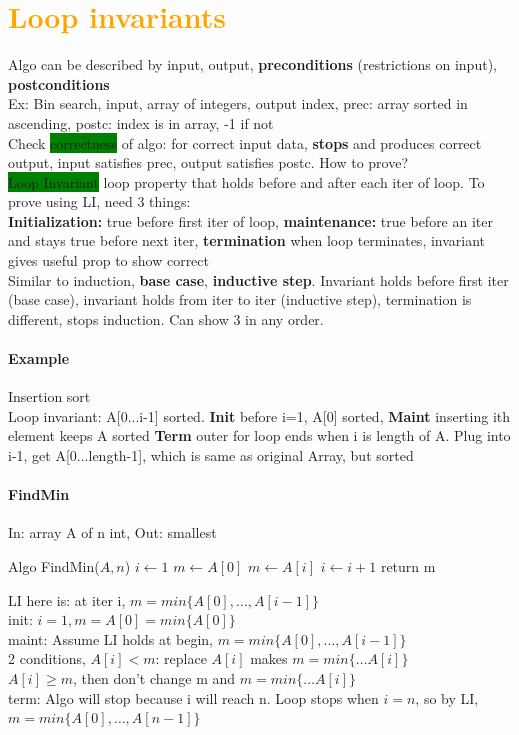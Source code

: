 \section{\textcolor{Orange}{Loop invariants}}
Algo can be described by input, output, \textbf{preconditions} (restrictions on input), \textbf{postconditions}
\\ Ex: Bin search, input, array of integers, output index, prec: array sorted in ascending, postc: index is in array, -1 if not
\\ Check \colorbox{Green}{correctness} of algo: for correct input data, \textbf{stops} and produces correct output, input satisfies prec, output satisfies postc. How to prove? 
\\ \colorbox{Green}{Loop Invariant} loop property that holds before and after each iter of loop. To prove using LI, need 3 things:
\\ \textbf{Initialization:} true before first iter of loop, \textbf{maintenance:} true before an iter and stays true before next iter, \textbf{termination} when loop terminates, invariant gives useful prop to show correct
\\ Similar to induction, \textbf{base case}, \textbf{inductive step}. Invariant holds before first iter (base case), invariant holds from iter to iter (inductive step), termination is different, stops induction. Can show 3 in any order.
\vspace{-7 pt}
\paragraph{Example}Insertion sort
\\ Loop invariant: A[0...i-1] sorted. \textbf{Init} before i=1, A[0] sorted, \textbf{Maint} inserting ith element keeps A sorted \textbf{Term} outer for loop ends when i is length of A. Plug into i-1, get A[0...length-1], which is same as original Array, but sorted
\vspace{-7 pt}
\paragraph{FindMin} In: array A of n int, Out: smallest
\begin{algorithmic}
	\State Algo FindMin($A,n$)
	\State $i \gets 1$
	\State $m \gets A[0]$
		 $m\gets A[i]$
		\State $i \gets i+1$
		\EndIf
	\EndWhile
	\State return m
\end{algorithmic}
LI here is: at iter i, $m=min\{A[0],\ldots,A[i-1]\}$
\\init: $i=1,m=A[0]=min\{A[0]\}$
\\maint: Assume LI holds at begin, $m=min\{A[0],\ldots,A[i-1]\}$
\\2 conditions, $A[i]<m$: replace $A[i]$ makes $m=min\{\ldots A[i]\}$
\\ $A[i]\geq m$, then don't change m and $m=min\{\ldots A[i]\}$
\\ term: Algo will stop because i will reach n. Loop stops when $i=n$, so by LI, $m=min\{A[0],\ldots,A[n-1]\}$
\color{ForestGreen}
